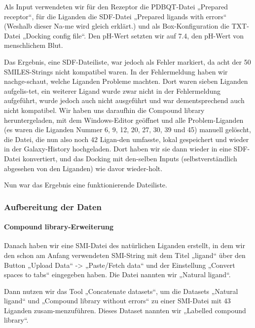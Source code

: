 \documentclass[11pt]{article}
\begin{document}

    Als Input verwendeten wir für den Rezeptor die PDBQT-Datei „Prepared receptor“, für die Liganden die SDF-Datei „Prepared ligands with errors“ (Weshalb dieser Na-me wird gleich erklärt.) und als Box-Konfiguration die TXT-Datei „Docking config file“. Den pH-Wert setzten wir auf 7.4, den pH-Wert von menschlichem Blut.

    Das Ergebnis, eine SDF-Dateiliste, war jedoch als Fehler markiert, da acht der 50 SMILES-Strings nicht kompatibel waren. In der Fehlermeldung haben wir nachge-schaut, welche Liganden Probleme machten. Dort waren sieben Liganden aufgelis-tet, ein weiterer Ligand wurde zwar nicht in der Fehlermeldung aufgeführt, wurde jedoch auch nicht ausgeführt und war dementsprechend auch nicht kompatibel. Wir haben uns daraufhin die Compound library heruntergeladen, mit dem Windows-Editor geöffnet und alle Problem-Liganden (es waren die Liganden Nummer 6, 9, 12, 20, 27, 30, 39 und 45) manuell gelöscht, die Datei, die nun also noch 42 Ligan-den umfasste, lokal gespeichert und wieder in der Galaxy-History hochgeladen. Dort haben wir sie dann wieder in eine SDF-Datei konvertiert, und das Docking mit den-selben Inputs (selbstverständlich abgesehen von den Liganden) wie davor wieder-holt.

    Nun war das Ergebnis eine funktionierende Dateiliste.


    \subsubsection{Aufbereitung der Daten}

    \paragraph{Compound library-Erweiterung}
    Danach haben wir eine SMI-Datei des natürlichen Liganden erstellt, in dem wir den schon am Anfang verwendeten SMI-String mit dem Titel „ligand“ über den Button „Upload Data“ -> „Paste/Fetch data“ und der Einstellung „Convert spaces to tabs“ eingegeben haben. Die Datei nannten wir „Natural ligand“.

    Dann nutzen wir das Tool „Concatenate datasets“, um die Datasets „Natural ligand“ und „Compound library without errors“ zu einer SMI-Datei mit 43 Liganden zusam-menzuführen. Dieses Dataset nannten wir „Labelled compound library“.
\end{document}
